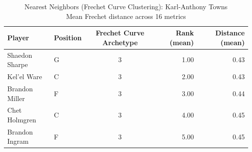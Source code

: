 \begin{table}[t]
\caption*{
{\fontsize{20}{25} Nearest Neighbors (Frechet Curve Clustering): Karl-Anthony Towns\fontsize{12}{15}\selectfont } \\ 
{\fontsize{14}{17}\selectfont  Mean Frechet distance across 16 metrics\fontsize{12}{15}\selectfont }
} 
\fontsize{12.0pt}{14.0pt}\selectfont
\begin{tabular*}{\linewidth}{@{\extracolsep{\fill}}llcrr}
\toprule
Player & Position & Frechet Curve Archetype & Rank (mean) & Distance (mean) \\ 
\midrule\addlinespace[2.5pt]
Shaedon Sharpe & G & 3 & 1.00 & 0.43 \\ 
Kel'el Ware & C & 3 & 2.00 & 0.43 \\ 
Brandon Miller & F & 3 & 3.00 & 0.44 \\ 
Chet Holmgren & C & 3 & 4.00 & 0.45 \\ 
Brandon Ingram & F & 3 & 5.00 & 0.45 \\ 
\bottomrule
\end{tabular*}
\end{table}

